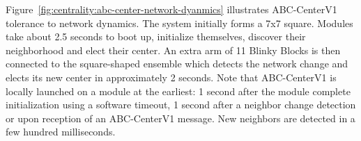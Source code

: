 
Figure~\ref{fig:centrality:abc-center-network-dyanmics} illustrates ABC-CenterV1 tolerance to network dynamics. The system initially forms a 7x7 square. Modules take about 2.5 seconds to boot up, initialize themselves, discover their neighborhood and elect their center. An extra arm of 11 Blinky Blocks is then connected to the square-shaped ensemble which detects the network change and elects its new center in approximately 2 seconds. Note that ABC-CenterV1 is locally launched on a module at the earliest: 1 second after the module complete initialization using a software timeout, 1 second after a neighbor change detection or upon reception of an ABC-CenterV1 message. New neighbors are detected in a few hundred milliseconds.

